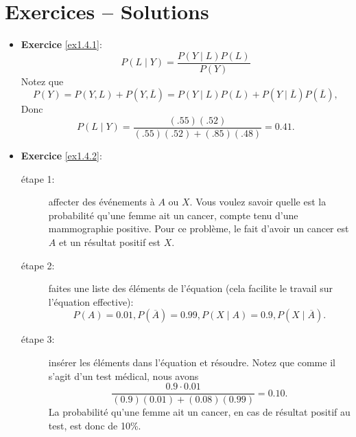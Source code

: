 \section*{Exercices -- Solutions}
\begin{itemize}
	
\item \textbf{Exercice }\ref{ex1.4.1}:  
$$ P(L\mid Y) = \frac{P(Y\mid L) P(L)}{P(Y)}$$
Notez que $$P(Y) = P(Y,L) + P(Y,\overline{L}) = P(Y\mid L) P(L) + P(Y\mid \overline{L}) P(\overline{L}),$$ Donc
$$P(L\mid Y) =\frac{(.55)(.52)}{(.55)(.52)+(.85)(.48)} = 0.41.$$

\item \textbf{Exercice }\ref{ex1.4.2}: 
\begin{description}
\item[\'etape 1:] affecter des \'ev\'enements \`a $A$ ou $X$. Vous voulez savoir quelle est la probabilit\'e qu'une femme ait un cancer, compte tenu d'une mammographie positive. Pour ce probl\`eme, le fait d'avoir un cancer est $A$ et un r\'esultat positif est $X$.
\item[\'etape 2:] faites une liste des \'el\'ements de l'\'equation (cela facilite le travail sur l'\'equation effective):
$$P(A) = 0.01, P(\overline{A})= 0.99, P(X\mid A)=0.9, P(X\mid \overline{A}).$$ 
\item[\'etape 3:] ins\'erer les \'el\'ements dans l'\'equation et r\'esoudre. Notez que comme il s'agit d'un test m\'edical, nous avons
$$\frac{0.9\cdot 0.01}{(0.9)(0.01)+(0.08)(0.99)} = 0.10.$$ 
La probabilit\'e qu'une femme ait un cancer, en cas de r\'esultat positif au test, est donc de 10\%. 
\end{description}


\end{itemize}
